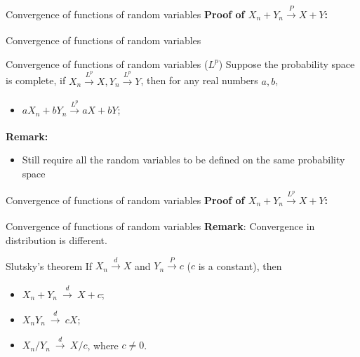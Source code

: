 \documentclass [aspectratio=169]{beamer}
\begin{document}
\begin{frame}{Convergence of functions of random variables}
\textbf{Proof of $X_n + Y_n \xrightarrow[]{P} X + Y$:}

\vspace{6cm}

\end{frame}

\begin{frame}{Convergence of functions of random variables}
    \begin{block}{Convergence of functions of random variables ($L^p$)}
     Suppose the probability space is complete, if $X_n  \xrightarrow[]{L^p} X, Y_n  \xrightarrow[]{L^p} Y$, then for any real numbers $a, b$, \begin{itemize}
        \item $aX_n + bY_n  \xrightarrow[]{L^p} aX + bY$;
    \end{itemize}
    \end{block}
    \vspace{0.1in}
    \textbf{Remark:}
    \begin{itemize}
        \item Still require all the random variables to be defined on the same probability space
        
    \end{itemize}
    \vspace{0.5in}
\end{frame}

\begin{frame}{Convergence of functions of random variables}
\textbf{Proof of $X_n + Y_n \xrightarrow[]{L^p} X + Y$:}

\vspace{6cm}

\end{frame}


\begin{frame}{Convergence of functions of random variables}
\textbf{Remark}: Convergence in distribution is different.
\vspace{0.1in}
        \begin{block}{Slutsky's theorem}
   If $X_n \xrightarrow[]{d} X$ and $Y_n \xrightarrow[]{P} c$ ($c$ is a constant), then
\begin{itemize}
    \item $X_{n}+Y_{n}\ {\xrightarrow {d}}\ X+c$;
    \item $X_{n}Y_{n}\ {\xrightarrow {d}}\ cX$;
    \item $X_{n}/Y_{n}\ {\xrightarrow {d}}\ X/c$, where $c \neq 0$.
\end{itemize}
    \end{block}
    \vspace{0.1in}
\end{frame}
\end{document}
